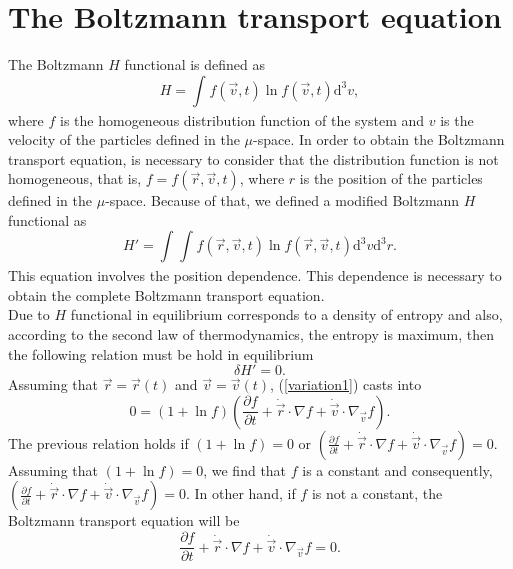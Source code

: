 \documentclass{article}
\begin{document}
\section{The Boltzmann transport equation}
The Boltzmann $H$ functional is defined as
\begin{equation}
    H=\int_{}^{}f(\vec{v},t)\ln f(\vec{v},t)\mathrm{d}^{3}v,
\end{equation}
where $f$ is the homogeneous distribution function of the system and $v$ is the velocity of the particles defined in the $\mu$-space. In order to obtain the Boltzmann transport equation, is necessary to consider that the distribution function is not homogeneous, that is, $f=f(\vec{r},\vec{v},t)$, where $r$ is the position of the particles defined in the $\mu$-space. Because of that, we defined a modified Boltzmann $H$ functional as
\begin{equation}
    H'=\int_{}^{}\int_{}^{}f(\vec{r},\vec{v},t)\ln f(\vec{r},\vec{v},t)\mathrm{d}^{3}v \mathrm{d}^{3}r.
\end{equation}
This equation involves the position dependence. This dependence is necessary to obtain the complete Boltzmann transport equation.\\
Due to $H$ functional in equilibrium corresponds to a density of entropy and also, according to the second law of thermodynamics, the entropy is maximum, then the following relation must be hold in equilibrium
\begin{equation}
    \delta H'=0.\label{variation1}
\end{equation}
Assuming that $\vec{r}=\vec{r}(t)$ and $\vec{v}=\vec{v}(t)$, (\ref{variation1}) casts into
\begin{equation}
    0=\left( 1+\ln f \right)\left( \frac{\partial f}{\partial t}+\dot{\vec{r}}\cdot \nabla f+\dot{\vec{v}}\cdot \nabla_{\vec{v}} f \right).
\end{equation}
The previous relation holds if $(1+\ln f)=0$ or $(\frac{\partial f}{\partial t}+\dot{\vec{r}}\cdot \nabla f+\dot{\vec{v}}\cdot \nabla_{\vec{v}} f)=0$.\\
Assuming that $(1+\ln f)=0$, we find that $f$ is a constant and consequently, $(\frac{\partial f}{\partial t}+\dot{\vec{r}}\cdot \nabla f+\dot{\vec{v}}\cdot \nabla_{\vec{v}} f)=0$. In other hand, if $f$ is not a constant, the Boltzmann transport equation will be
\begin{equation}
    \frac{\partial f}{\partial t}+\dot{\vec{r}}\cdot \nabla f+\dot{\vec{v}}\cdot \nabla_{\vec{v}} f=0.\label{transport}
\end{equation}
\end{document}
